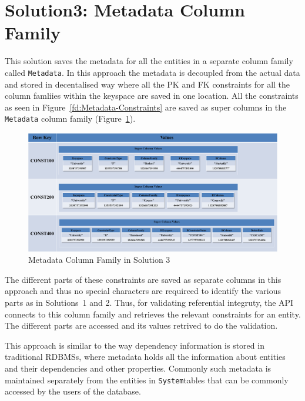 \section{Solution3:  Metadata Column Family} \label{s:design-sol3}

This solution saves the metadata for all the entities in a separate column
family called \texttt{Metadata}.  In this approach the metadata is
decoupled from the actual data and stored in decentalised way where all the
\ac{PK} and \ac{FK} constraints for all the column famliies within the keyspace
are saved in one location. All the constraints as seen in
Figure~\ref{fd:Metadata-Constraints} are saved as super columns in the
\texttt{Metadata} column family (Figure~\ref{fd:Metadata-Solution3}). 
 
	\begin{figure}[h] 
		\centering
		\includegraphics[width=.8\textwidth]{./figure/Solutions/Sol3-MD-ColumnFamily.png}
		\caption{Metadata Column Family in Solution 3}\label{fd:Metadata-Solution3}
	\end{figure}

The different parts of these constraints are saved as separate columns in this
approach and thus no special characters are requireed to identify the various
parts as in Solutions~1 and 2. Thus, for validating referential integruty, the
\ac{API} connects to this column family and retrieves the relevant constraints
for an entity. The different parts are accessed and its values retrived to do
the validation.

This approach is similar to the way dependency information is
stored in traditional \acp{RDBMS}, where metadata holds all the information
about entities and their dependencies and other properties. Commonly such
metadata is maintained separately from the entities in \texttt{System}tables
that can be commonly accessed by the users of the database. 

